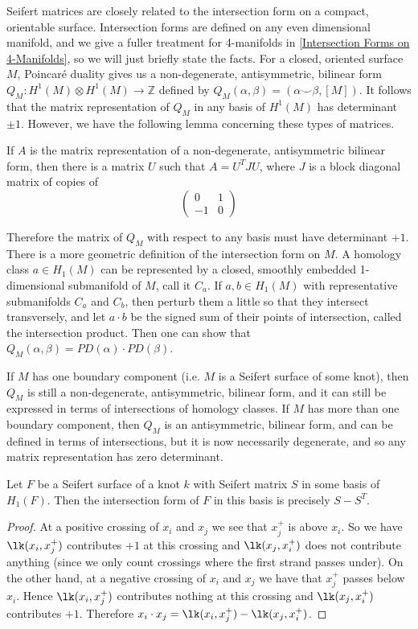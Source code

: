 Seifert matrices are closely related to the intersection form on a compact, orientable surface. Intersection forms are defined on any even dimensional manifold, and we give a fuller treatment for 4-manifolds in \cref{Intersection Forms on 4-Manifolds}, so we will just briefly state the facts. For a closed, oriented surface $M$, Poincar\'{e} duality gives us a non-degenerate, antisymmetric, bilinear form $Q_M : H^1(M) \otimes H^1(M) \rightarrow \mathbb Z$ defined by $Q_M(\alpha,\beta) = (\alpha \smallsmile \beta,[M])$. It follows that the matrix representation of $Q_M$ in any basis of $H^1(M)$ has determinant $\pm 1$. However, we have the following lemma concerning these types of matrices.
\begin{lem}
If $A$ is the matrix representation of a non-degenerate, antisymmetric bilinear form, then there is a matrix $U$ such that $A = U^T J U$, where $J$ is a block diagonal matrix of copies of 
\[ \left( \begin{array}{rr} 0&1\\-1&0 \end{array} \right) \]
\end{lem}
Therefore the matrix of $Q_M$ with respect to any basis must have determinant $+1$. There is a more geometric definition of the intersection form on $M$. A homology class $a \in H_1(M)$ can be represented by a closed, smoothly embedded 1-dimensional submanifold of $M$, call it $C_a$. If $a,b \in H_1(M)$ with representative submanifolds $C_a$ and $C_b$, then perturb them a little so that they intersect transversely, and let $a \cdot b$ be the signed sum of their points of intersection, called the intersection product. Then one can show that $Q_M(\alpha,\beta)=PD(\alpha) \cdot PD(\beta)$.

If $M$ has one boundary component (i.e. $M$ is a Seifert surface of some knot), then $Q_M$ is still a non-degenerate, antisymmetric, bilinear form, and it can still be expressed in terms of intersections of homology classes. If $M$ has more than one boundary component, then $Q_M$ is an antisymmetric, bilinear form, and can be defined in terms of intersections, but it is now necessarily degenerate, and so any matrix representation has zero determinant.

\begin{prop}
\label{intersection forms and Seifert matrices}
Let $F$ be a Seifert surface of a knot $k$ with Seifert matrix $S$ in some basis of $H_1(F)$. Then the intersection form of $F$ in this basis is precisely $S-S^T$.
\end{prop}
\begin{proof}
At a positive crossing of $x_i$ and $x_j$ we see that $x_j^+$ is above $x_i$. So we have $\lk(x_i,x_j^+)$ contributes $+1$ at this crossing and $\lk(x_j,x_i^+)$ does not contribute anything (since we only count crossings where the first strand passes under). On the other hand, at a negative crossing of $x_i$ and $x_j$ we have that $x_j^+$ passes below $x_i$. Hence $\lk(x_i,x_j^+)$ contributes nothing at this crossing and $\lk(x_j,x_i^+)$ contributes $+1$. Therefore $x_i \cdot x_j = \lk(x_i,x_j^+) - \lk(x_j,x_i^+)$.
\end{proof}

